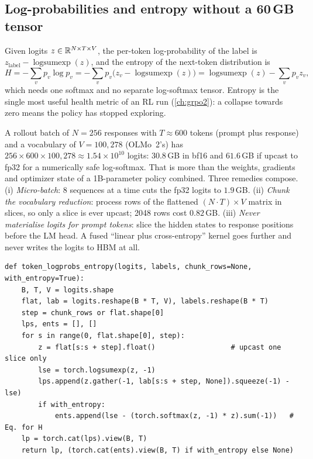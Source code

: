\subsection{Log-probabilities and entropy without a 60\,GB tensor}\label{sec:pg:logprobs}

Given logits $z\in\mathbb{R}^{N\times T\times V}$, the per-token log-probability of the label is
$z_{\text{label}}-\operatorname{logsumexp}(z)$, and the entropy of the next-token distribution
is
\begin{equation}
H=-\sum_v p_v\log p_v=-\sum_v p_v\big(z_v-\operatorname{logsumexp}(z)\big)
 =\operatorname{logsumexp}(z)-\sum_v p_v z_v ,
\label{eq:pg:entropy}
\end{equation}
which needs one softmax and no separate log-softmax tensor. Entropy is the single most useful
health metric of an RL run (\cref{ch:grpo2}): a collapse towards zero means the policy has
stopped exploring.

\begin{napkinmath}
A rollout batch of $N=256$ responses with $T\approx600$ tokens (prompt plus response) and a
vocabulary of $V=100{,}278$ (OLMo~2's) has
$256\times600\times100{,}278\approx1.54\times10^{10}$ logits: $30.8$\,GB in bf16 and
$61.6$\,GB if upcast to fp32 for a numerically safe log-softmax. That is more than the
weights, gradients and optimizer state of a 1B-parameter policy combined. Three remedies
compose. (i) \emph{Micro-batch}: 8 sequences at a time cuts the fp32 logits to $1.9$\,GB.
(ii) \emph{Chunk the vocabulary reduction}: process rows of the flattened $(N\cdot T)\times V$
matrix in slices, so only a slice is ever upcast; 2048 rows cost $0.82$\,GB. (iii) \emph{Never
materialise logits for prompt tokens}: slice the hidden states to response positions before
the LM head. A fused ``linear plus cross-entropy'' kernel goes further and never writes the
logits to HBM at all.
\end{napkinmath}

\begin{lstlisting}[caption={Chunked per-token log-probabilities and entropies in fp32 (\code{llmsys.pg.token\_logprobs\_entropy}).},label={lst:pg:logprobs}]
def token_logprobs_entropy(logits, labels, chunk_rows=None, with_entropy=True):
    B, T, V = logits.shape
    flat, lab = logits.reshape(B * T, V), labels.reshape(B * T)
    step = chunk_rows or flat.shape[0]
    lps, ents = [], []
    for s in range(0, flat.shape[0], step):
        z = flat[s:s + step].float()                  # upcast one slice only
        lse = torch.logsumexp(z, -1)
        lps.append(z.gather(-1, lab[s:s + step, None]).squeeze(-1) - lse)
        if with_entropy:
            ents.append(lse - (torch.softmax(z, -1) * z).sum(-1))   # Eq. for H
    lp = torch.cat(lps).view(B, T)
    return lp, (torch.cat(ents).view(B, T) if with_entropy else None)
\end{lstlisting}

